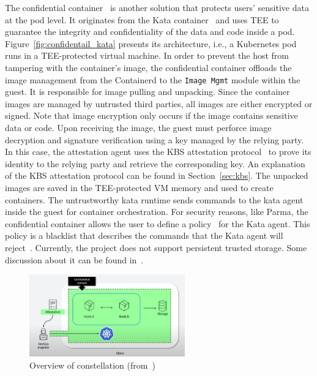 The confidential container~\cite*{confidential_kata} is another solution that protects users' sensitive data at the pod level. It originates from the Kata container~\cite*{Kata-Containers} and uses \acrshort{TEE} to guarantee the integrity and confidentiality of the data and code inside a pod. 
Figure~\ref{fig:confidentail_kata} presents its architecture, i.e., a Kubernetes pod runs in a 
TEE-protected virtual machine. In order to prevent the host from tampering with the container's image, the confidential container offloads the image management from the Containerd\cite*{containerd} to the \texttt{Image Mgmt} module within the guest. It is responsible for image pulling and unpacking. 
Since the container images are managed by untrusted third parties, all images are either encrypted or signed. Note that image encryption only occurs if the image contains sensitive data or code. Upon receiving the image, the guest must perforce image decryption and signature 
verification using a key managed by the relying party. In this case, the attestation agent uses the KBS attestation protocol~\cite*{kbs_Attestation_protocol} to prove its identity to the relying party and retrieve the corresponding key. An explanation of the KBS attestation protocol can be found 
in Section~\ref{sec:kbs}. The unpacked images are saved in the TEE-protected VM memory and used to create containers. The untrustworthy kata runtime sends commands to the kata agent inside the guest for container 
orchestration. For security reasons, like Parma, the confidential container allows the user to define a policy~\cite*{kata_api_restriction} for the Kata agent. This policy is a blacklist that describes the commands that the Kata agent will reject~\cite*{kata_api_restriction}. Currently, the project does not support persistent trusted storage. 
Some discussion about it can be found in~\cite*{confidentail_kata_storage}.

\begin{figure}[htp]
    \centering
    \includegraphics[width=0.6\textwidth]{images/constellation_arch.png}
    \caption[Overview of constellation]{Overview of constellation (from~\cite*{Constellation_Always_encrypted})}
    \label{fig:constellation_arch}
\end{figure}

